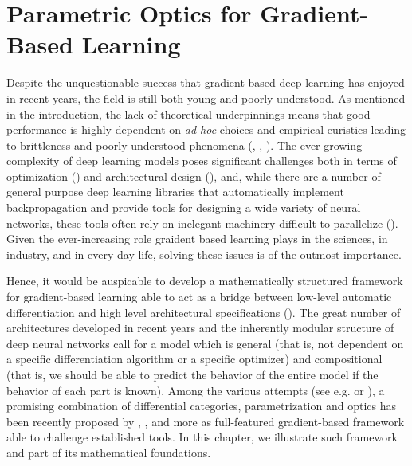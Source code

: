 \documentclass[11pt,a4paper,openright,twoside]{report}
\theoremstyle{plain}
\theoremstyle{definition}
\begin{document}
\chapter{Parametric Optics for Gradient-Based Learning}

\lhead[\fancyplain{}{\bfseries\thepage}]{\fancyplain{}{\bfseries\rightmark}}




Despite the unquestionable success that gradient-based deep learning has enjoyed in recent years, the field is still both young and poorly understood. As mentioned in the introduction, the lack of theoretical underpinnings means that good performance is highly dependent on \textit{ad hoc} choices and empirical euristics leading to brittleness and poorly understood phenomena (\cite{cruttwell2022categorical}, \cite{shiebler2021category}, \cite{gavranovic2024fundamental}). The ever-growing complexity of deep learning models poses significant challenges both in terms of optimization (\cite{elliott2018simple}) and architectural design (\cite{gavranovicposition}), and, while there are a number of general purpose deep learning libraries that automatically implement backpropagation and provide tools for designing a wide variety of neural networks, these tools often rely on inelegant machinery difficult to parallelize (\cite{elliott2018simple}). Given the ever-increasing role graident based learning plays in the sciences, in industry, and in every day life, solving these issues is of the outmost importance. 

Hence, it would be auspicable to develop a mathematically structured framework for gradient-based learning able to act as a bridge between low-level automatic differentiation and high level architectural specifications (\cite{gavranovic2024fundamental}). The great number of architectures developed in recent years and the inherently modular structure of deep neural networks call for a model which is general (that is, not dependent on a specific differentiation algorithm or a specific optimizer) and compositional (that is, we should be able to predict the behavior of the entire model if the behavior of each part is known). Among the various attempts (see e.g. \cite{fong2019backprop} or \cite{sennesh2023computing}), a promising combination of differential categories, parametrization and optics has been recently proposed by \cite{cockett2019reverse}, \cite{cruttwell2022categorical}, \cite{gavranovic2024fundamental} and more as full-featured gradient-based framework able to challenge established tools. In this chapter, we illustrate such framework  and part of its mathematical foundations. 
\end{document}
